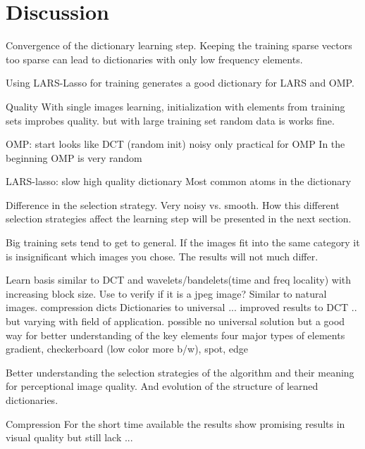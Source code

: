 \chapter{Discussion}

Convergence of the dictionary learning step.
Keeping the training sparse vectors too sparse can lead to dictionaries with
only low frequency elements. 

Using LARS-Lasso for training generates a good dictionary for LARS and OMP. 

Quality
With single images learning, initialization with elements from training sets
improbes quality. but with large training set random data is works fine.

OMP:
  start looks like DCT (random init)
  noisy
  only practical for OMP
  In the beginning OMP is very random

LARS-lasso:
  slow 
  high quality dictionary
  Most common atoms in the dictionary 




Difference in the selection strategy.
Very noisy vs. smooth. 
How this different selection strategies affect the learning step will be
presented in the next section.

Big training sets tend to get to general.
If the images fit into the same category it is insignificant which images you
chose. The results will not much differ.

Learn basis similar to DCT and wavelets/bandelets(time and freq locality) with
increasing block size. Use to verify if it is a jpeg image?
Similar to natural images.
compression dicts
Dictionaries to universal ... improved results to DCT .. but varying with field
of application. possible no universal solution but a good way for better
understanding of the key elements
  four major types of elements
  gradient, checkerboard (low color more b/w), spot, edge


Better understanding the selection strategies of the algorithm and their
meaning for perceptional image quality. And evolution of the structure of
learned dictionaries. 

Compression
For the short time available the results show promising results in visual
quality but still lack ...

